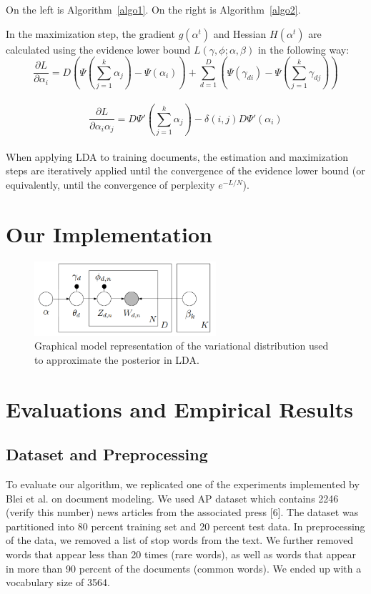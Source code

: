 \documentclass{article} %
\begin{document}
On the left is Algorithm~\ref{algo1}. On the right is Algorithm~\ref{algo2}.

\lipsum[2]



In the maximization step, the gradient $g(\alpha^{t})$ and Hessian $H(\alpha^{t})$ are calculated using the evidence lower bound $L(\gamma,\phi;\alpha,\beta)$ in the following way:\\
$$\frac{\partial L}{\partial \alpha_i} = D(\Psi (\sum_{j=1}^{k}\alpha_j)-\Psi(\alpha_i)) + \sum_{d=1}^{D}(\Psi(\gamma_{di}) -\Psi(\sum_{j=1}^{k}\gamma_{dj}))$$\\
$$\frac{\partial L}{\partial \alpha_i \alpha_j} = D\Psi'(\sum_{j=1}^{k}\alpha_j) - \delta (i,j)D\Psi'(\alpha_i)$$\\
When applying LDA to training documents, the estimation and maximization steps are iteratively applied until the convergence of the evidence lower bound (or equivalently, until the convergence of perplexity $e^{-L/N}$).

\section{Our Implementation}
\begin{figure}
    \centering
    \includegraphics[width=0.6\textwidth]{vi}
    \caption{Graphical model representation of the variational distribution used to approximate the posterior in LDA.}
    \label{fig:graphmodel}
\end{figure}


\section{Evaluations and Empirical Results}
\subsection{Dataset and Preprocessing}
To evaluate our algorithm, we replicated one of the experiments implemented by Blei et al. on document modeling. We used AP dataset which contains 2246 (verify this number) news articles from the associated press [6]. The dataset was partitioned into 80 percent training set and 20 percent test data. In preprocessing of the data, we removed a list of stop words from the text. We further removed words that appear less than 20 times (rare words), as well as words that appear in more than 90 percent of the documents (common words). We ended up with a vocabulary size of 3564.
\end{document}
